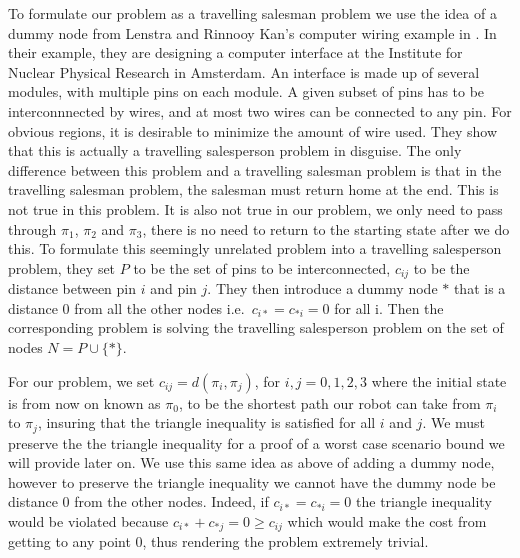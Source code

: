 To formulate our problem as a travelling salesman problem we use the idea of a dummy node from Lenstra and Rinnooy Kan's computer wiring example in \cite{lenstra75}. In their example, they are designing a computer interface at the Institute for Nuclear Physical Research in Amsterdam. An interface is made up of several modules, with multiple pins on each module. A given subset of pins has to be interconnnected by wires, and at most two wires can be connected to any pin. For obvious regions, it is desirable to minimize the amount of wire used. They show that this is actually a travelling salesperson problem in disguise. The only difference between this problem and a travelling salesman problem is that in the travelling salesman problem, the salesman must return home at the end. This is not true in this problem. It is also not true in our problem, we only need to pass through $\pi_1$, $\pi_2$ and $\pi_3$, there is no need to return to the starting state after we do this. To formulate this seemingly unrelated problem into a travelling salesperson problem, they set $P$ to be the set of pins to be interconnected, $c_{ij}$ to be the distance between pin $i$ and pin $j$. They then introduce a dummy node $*$ that is a distance 0 from all the other nodes i.e.\ $c_{i*} = c_{*i} = 0$ for all i. Then the corresponding problem is solving the travelling salesperson problem on the set of nodes $N=P \cup \{*\}$. 

For our problem, we set $c_{ij}=d(\pi_i , \pi_j)$, for $i,j=0,1,2,3$ where the initial state is from now on known as $\pi_0$, to be the shortest path our robot can take from $\pi_i$ to $\pi_j$, insuring that the triangle inequality is satisfied for all $i$ and $j$. We must preserve the the triangle inequality for a proof of a worst case scenario bound we will provide later on. We use this same idea as above of adding a dummy node, however to preserve the triangle inequality we cannot have the dummy node be distance 0 from the other nodes. Indeed, if $c_{i*} = c_{*i} = 0 $ the triangle inequality would be violated because $c_{i*} + c_{*j} = 0 \geq c_{ij}$ which would make the cost from getting to any point 0, thus rendering the problem extremely trivial. 

